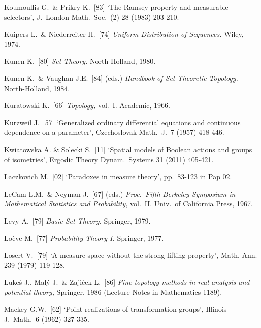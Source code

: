 {Koumoullis G.\ \& Prikry K.\ [83] `The Ramsey property and measurable
selectors', J.\ London Math.\ Soc.\ (2) 28 (1983) 203-210.
\cmmnt{[451T.]}

Kuipers L.\ \& Niederreiter H.\ [74] {\it Uniform Distribution of
Sequences.}   Wiley, 1974.
\cmmnt{[491Z.]}

Kunen K.\ [80] {\it Set Theory.}  North-Holland, 1980.
\cmmnt{[\S4A1, 4A2E.]}

Kunen K.\ \& Vaughan J.E.\ [84] (eds.) {\it Handbook of Set-Theoretic
Topology.}   North-Holland, 1984.

Kuratowski K.\  [66] {\it Topology,} vol.\ I.   Academic, 1966.
\cmmnt{[423R, 462Ye, \S4A2, 4A3R.]}

Kurzweil J.\ [57] `Generalized ordinary differential equations and
continuous dependence on a parameter', Czechoslovak Math.\ J.\ 7 (1957)
418-446.

Kwiatowska A. \& Solecki S.\ [11] `Spatial models of Boolean actions and
groups of isometries', Ergodic Theory Dynam.\ Systems 31 (2011) 405-421.
\cmmnt{[\S448 {\it notes\/}.]}

\medskip%

Laczkovich M.\ [02] `Paradoxes in measure theory', pp.\ 83-123 in 
{\smc Pap 02}.
\cmmnt{[\S449 {\it notes\/}.]}

LeCam L.M.\ \& Neyman J.\ [67] (eds.) {\it Proc.\ Fifth Berkeley
Symposium in Mathematical Statistics and Probability}, vol.\ II.
Univ.\ of California Press, 1967.

Levy A.\ [79] {\it Basic Set Theory.}  Springer, 1979.
\cmmnt{[\S4A1.]}

Lo\`eve M.\ [77] {\it Probability Theory I.} Springer, 1977.
\cmmnt{[\S495 {\it notes\/}.]}

Losert V.\ [79] `A measure space without the strong lifting property',
Math. Ann. 239 (1979) 119-128.
\cmmnt{[453N, \S453 {\it notes\/}.]}

Luke\v{s} J., Mal\'y J.\ \& Zaj\'\i\v{c}ek L.\ [86]
{\it Fine topology methods
in real analysis and potential theory,} Springer, 1986 (Lecture Notes in
Mathematics 1189).
\cmmnt{[414Ye.]}

\medskip%

Mackey G.W.\ [62] `Point realizations of transformation
groups', Illinois J.\ Math.\ 6 (1962) 327-335.
\cmmnt{[448S.]}

}
